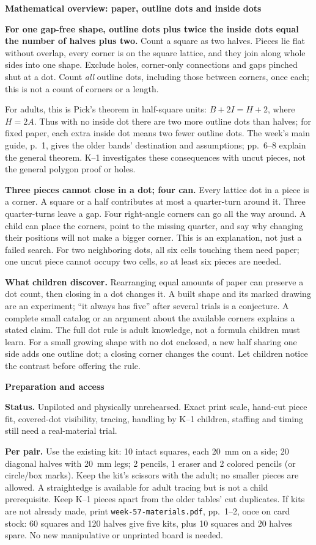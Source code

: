 \documentclass[11pt]{article}
\newcommand{\head}[1]{\par\textbf{\large #1}\par}
\begin{document}
\head{Mathematical overview: paper, outline dots and inside dots}
\textbf{For one gap-free shape, outline dots plus twice the inside dots equal the number of halves plus two.} Count a square as two halves. Pieces lie flat without overlap, every corner is on the square lattice, and they join along whole sides into one shape. Exclude holes, corner-only connections and gaps pinched shut at a dot. Count \emph{all} outline dots, including those between corners, once each; this is not a count of corners or a length.

For adults, this is Pick's theorem in half-square units: $B+2I=H+2$, where $H=2A$. Thus with no inside dot there are two more outline dots than halves; for fixed paper, each extra inside dot means two fewer outline dots. The week's main guide, p.~1, gives the older bands' destination and assumptions; pp.~6--8 explain the general theorem. K--1 investigates these consequences with uncut pieces, not the general polygon proof or holes.

\textbf{Three pieces cannot close in a dot; four can.} Every lattice dot in a piece is a corner. A square or a half contributes at most a quarter-turn around it. Three quarter-turns leave a gap. Four right-angle corners can go all the way around. A child can place the corners, point to the missing quarter, and say why changing their positions will not make a bigger corner. This is an explanation, not just a failed search. For two neighboring dots, all six cells touching them need paper; one uncut piece cannot occupy two cells, so at least six pieces are needed.

\textbf{What children discover.} Rearranging equal amounts of paper can preserve a dot count, then closing in a dot changes it. A built shape and its marked drawing are an experiment; ``it always has five'' after several trials is a conjecture. A complete small catalog or an argument about the available corners explains a stated claim. The full dot rule is adult knowledge, not a formula children must learn. For a small growing shape with no dot enclosed, a new half sharing one side adds one outline dot; a closing corner changes the count. Let children notice the contrast before offering the rule.

\head{Preparation and access}
\textbf{Status.} Unpiloted and physically unrehearsed. Exact print scale, hand-cut piece fit, covered-dot visibility, tracing, handling by K--1 children, staffing and timing still need a real-material trial.

\textbf{Per pair.} Use the existing kit: 10 intact squares, each 20~mm on a side; 20 diagonal halves with 20~mm legs; 2 pencils, 1 eraser and 2 colored pencils (or circle/box marks). Keep the kit's scissors with the adult; no smaller pieces are allowed. A straightedge is available for adult tracing but is not a child prerequisite. Keep K--1 pieces apart from the older tables' cut duplicates. If kits are not already made, print \texttt{week-57-materials.pdf}, pp.~1--2, once on card stock: 60 squares and 120 halves give five kits, plus 10 squares and 20 halves spare. No new manipulative or unprinted board is needed.
\end{document}
